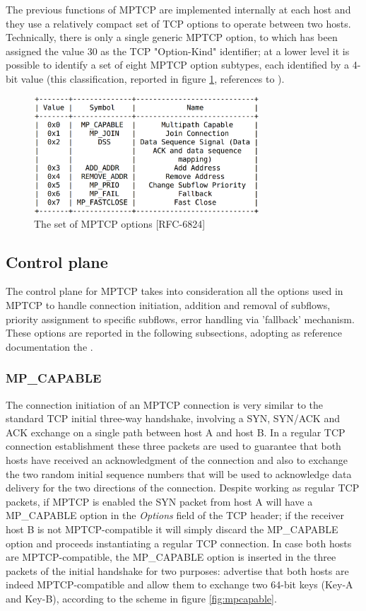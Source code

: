 The previous functions of MPTCP are implemented internally at each host and they use a relatively compact set of TCP options to operate between two hosts. Technically, there is only a single generic MPTCP option, to which has been assigned the value 30 as the TCP "Option-Kind" identifier; at a lower level it is possible to identify a set of eight MPTCP option subtypes, each identified by a 4-bit value (this classification, reported in figure \ref{fig:MPTCP_options}, references to ). 

\begin{figure}[!htb]
\centering
\includegraphics[width=0.75\textwidth]{images/MPTCP_options}
\caption{The set of MPTCP options [RFC-6824]}
\label{fig:MPTCP_options}
\end{figure}

\subsection{Control plane}
The control plane for MPTCP takes into consideration all the options used in MPTCP to handle connection initiation, addition and removal of subflows, priority assignment to specific subflows, error handling via 'fallback' mechanism. These options are reported in the following subsections, adopting as reference documentation the .

\subsubsection{MP\_CAPABLE}
The connection initiation of an MPTCP connection is very similar to the standard TCP initial three-way handshake, involving a SYN, SYN/ACK and ACK exchange on a single path between host A and host B. In a regular TCP connection establishment these three packets are used to guarantee that both hosts have received an acknowledgment of the connection and also to exchange the two random initial sequence numbers that will be used to acknowledge data delivery for the two directions of the connection. Despite working as regular TCP packets, if MPTCP is enabled the SYN packet from host A will have a MP\_CAPABLE option in the \textit{Options} field of the TCP header; if the receiver host B is not MPTCP-compatible it will simply discard the MP\_CAPABLE option and proceeds instantiating a regular TCP connection.
In case both hosts are MPTCP-compatible, the MP\_CAPABLE option is inserted in the three packets of the initial handshake for two purposes: advertise that both hosts are indeed MPTCP-compatible and allow them to exchange two 64-bit keys (Key-A and Key-B), according to the scheme in figure \ref{fig:mpcapable}.

